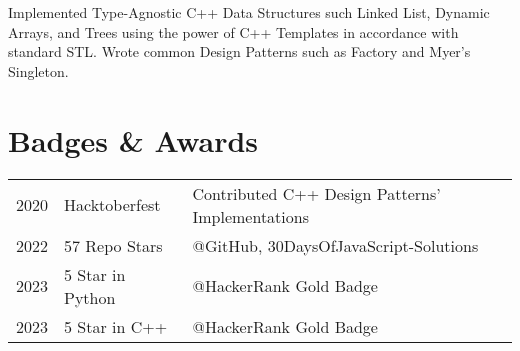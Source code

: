 \documentclass[]{deedy-resume-openfont}
\begin{document}
\begin{minipage}[t]{0.66\textwidth}
Implemented Type-Agnostic C++ Data Structures such Linked List, Dynamic Arrays, and Trees  using the power of C++ Templates in accordance with standard STL. Wrote common Design Patterns such as Factory and Myer's Singleton.
\sectionsep


\section{Badges \& Awards} 
\begin{tabular}{rll}
2020	     & Hacktoberfest  & Contributed C++ Design Patterns' Implementations\\
2022         & 57 Repo Stars   & @GitHub, 30DaysOfJavaScript-Solutions \\
2023	     & 5 Star in Python  & @HackerRank Gold Badge \\
2023         & 5 Star in C++     & @HackerRank Gold Badge \\

\end{tabular}
\sectionsep


\end{minipage}
\end{document}
